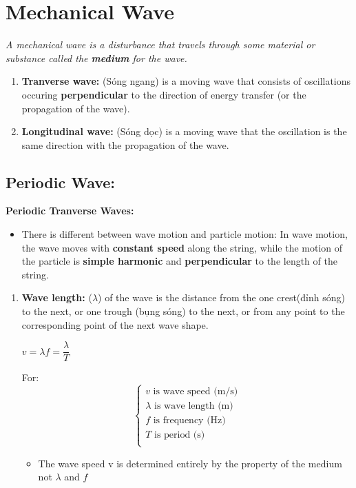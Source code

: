 \documentclass[10pt]{article}
\begin{document}
\section{Mechanical Wave}
\textit{A mechanical wave is a disturbance that travels through some material or substance called the \textbf{medium} for the wave.}
\begin{enumerate}
	\item \textbf{Tranverse wave:} (Sóng ngang) is a moving wave that consists of oscillations occuring \textbf{perpendicular} to the direction of energy transfer (or the propagation of the wave).
	\item \textbf{Longitudinal wave:} (Sóng dọc) is a moving wave that the oscillation is the same direction with the propagation of the wave.
\end{enumerate}

\subsection{Periodic Wave:}
\textbf{Periodic Tranverse Waves:} \\
\begin{itemize}
	\item There is different between wave motion and particle motion: In wave motion, the wave moves with \textbf{constant speed} along the string, while the motion of the particle is \textbf{simple harmonic} and \textbf{perpendicular} to the length of the string.
\end{itemize}

\begin{enumerate}
	\item \textbf{Wave length:} ($\lambda$) of the wave is the distance from the one crest(đỉnh sóng) to the next, or one trough (bụng sóng) to the next, or from any point to the corresponding point of the next wave shape. \\
	\begin{mybox}
		\begin{center}
			$v = \lambda f = \dfrac{\lambda}{T}$
		\end{center}
	\end{mybox}
	For: \\
	$$
	\begin{cases}
		v \mbox{ is wave speed (m/s)} \\
		\lambda \mbox{ is wave length (m)} \\
		f \mbox{ is frequency (Hz)} \\
		T \mbox{ is period (s)} \\
	\end{cases}
	$$
	\begin{itemize}
		\item The wave speed v is determined entirely by the property of the medium not $\lambda$ and $f$
	\end{itemize}
\end{enumerate}
\end{document}
